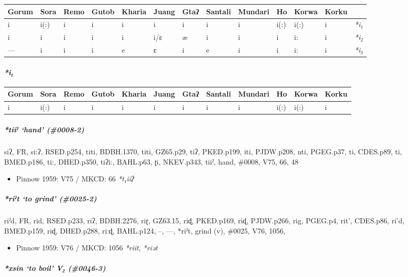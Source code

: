 \documentclass[a4paper,]{article}
\providecommand{\tightlist}{%
  \setlength{\itemsep}{0pt}\setlength{\parskip}{0pt}}
\let\oldparagraph\paragraph
\renewcommand{\paragraph}[1]{\oldparagraph{#1}\mbox{}}
\let\oldsubparagraph\subparagraph
\renewcommand{\subparagraph}[1]{\oldsubparagraph{#1}\mbox{}}
\begin{document}
\begin{longtable}[]{@{}lllllllllllll@{}}
\toprule
Gorum & Sora & Remo & Gutob & Kharia & Juang & Gtaʔ & Santali & Mundari
& Ho & Korwa & Korku &\tabularnewline
\midrule
\endhead
i & i(:) & i & i & i & i & i & i & i & i(:) & i(:) & i &
\emph{*i₁}\tabularnewline
i & i & i & i & i & i/ɛ & æ & i & i & i & i: & i &
\emph{*i₂}\tabularnewline
--- & i & i & i & e & ɛ & i & e & i & i & i: & i &
\emph{*i₃}\tabularnewline
\bottomrule
\end{longtable}

\paragraph{\texorpdfstring{\emph{*i₁}}{*i₁}}\label{i}

\begin{longtable}[]{@{}llllllllllll@{}}
\toprule
Gorum & Sora & Remo & Gutob & Kharia & Juang & Gtaʔ & Santali & Mundari
& Ho & Korwa & Korku\tabularnewline
\midrule
\endhead
i & i(:) & i & i & i & i & i & i & i & i(:) & i(:) & i\tabularnewline
\bottomrule
\end{longtable}

\subparagraph{\texorpdfstring{\emph{*tiiˀ} `hand'
(\#0008-2)}{*tiiˀ hand (\#0008-2)}}\label{tiiux2c0-hand-0008-2}

siʔ, FR, si:ʔ, RSED.p254, titi, BDBH.1370, titi, GZ65.p29, tiʔ,
PKED.p199, iti, PJDW.p208, nti, PGEG.p37, ti, CDES.p89, ti, BMED.p186,
ti:, DHED.p350, tiʔi:, BAHL.p63, ʈi, NKEV.p343, tiiˀ, hand, \#0008, V75,
66, 48

\begin{itemize}
\tightlist
\item
  Pinnow 1959: V75 / MKCD: 66 \emph{*t₁iiʔ}
\end{itemize}

\subparagraph{\texorpdfstring{\emph{*riˀt} `to grind'
(\#0025-2)}{*riˀt to grind (\#0025-2)}}\label{riux2c0t-to-grind-0025-2}

riˀd, FR, rid, RSED.p233, riʔ, BDBH.2276, riɽ, GZ63.15, riɖ, PKED.p169,
riɖ, PJDW.p266, rig, PGEG.p4, rit', CDES.p86, ri'd, BMED.p159, riɖ,
DHED.p288, ri:ɖ, BAHL.p124, --, ---, *riˀt, grind (v), \#0025, V76,
1056,

\begin{itemize}
\tightlist
\item
  Pinnow 1959: V76 / MKCD: 1056 \emph{*riit}, \emph{*riət}
\end{itemize}

\subparagraph{\texorpdfstring{\emph{*xsin} `to boil' V₂
(\#0046-3)}{*xsin to boil V₂ (\#0046-3)}}\label{xsin-to-boil-v-0046-3}
\end{document}
